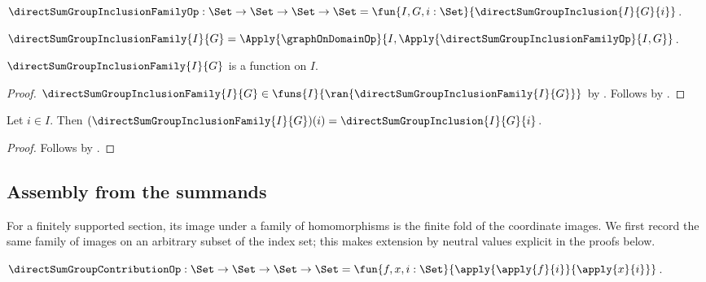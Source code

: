 \begin{definition}\label{direct_sum_group_inclusion_family_op}
    $\directSumGroupInclusionFamilyOp:
        \Set\to\Set\to\Set\to\Set
        =\fun{I,G,i:\Set}{\directSumGroupInclusion{I}{G}{i}}$.
\end{definition}

\begin{definition}\label{direct_sum_group_inclusion_family}
    $\directSumGroupInclusionFamily{I}{G}
        =\Apply{\graphOnDomainOp}{
            I,\Apply{\directSumGroupInclusionFamilyOp}{I,G}}$.
\end{definition}

\begin{proposition}\label{direct_sum_group_inclusion_family_type}
    $\directSumGroupInclusionFamily{I}{G}$ is a function on $I$.
\end{proposition}
\begin{proof}
    $\directSumGroupInclusionFamily{I}{G}\in
        \funs{I}{\ran{\directSumGroupInclusionFamily{I}{G}}}$ by
        .
    Follows by .
\end{proof}

\begin{proposition}\label{direct_sum_group_inclusion_family_apply}
    Let $i\in I$.
    Then
        $(\directSumGroupInclusionFamily{I}{G})(i)
            =\directSumGroupInclusion{I}{G}{i}$.
\end{proposition}
\begin{proof}
    Follows by
        .
\end{proof}

\subsection{Assembly from the summands}

For a finitely supported section, its image under a family of homomorphisms is
the finite fold of the coordinate images.  We first record the same family of
images on an arbitrary subset of the index set; this makes extension by
neutral values explicit in the proofs below.

\begin{definition}\label{direct_sum_group_contribution_op}
    $\directSumGroupContributionOp:
        \Set\to\Set\to\Set\to\Set
        =\fun{f,x,i:\Set}{\apply{\apply{f}{i}}{\apply{x}{i}}}$.
\end{definition}

